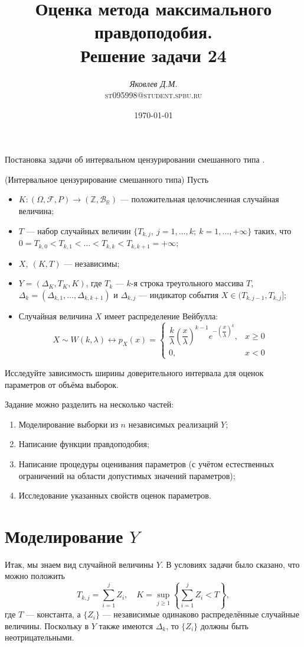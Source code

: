 \documentclass{article}
\title{Оценка метода максимального правдоподобия.\\
	Решение задачи 24}
\author{\emph{Яковлев Д.М.}\\\textsc{st095998@student.spbu.ru}}
\date{\today}
\DeclareMathOperator\R{\mathbb{R}}
\begin{document}
	\maketitle
	\nocite{RomGu}
	Постановка задачи об интервальном цензурировании смешанного типа \cite{ankorMLE}.
 
 	(Интервальное цензурирование смешанного типа) Пусть
 	\begin{itemize}
 		\item $K:(\Omega, \mathcal{F}, P)\rightarrow(\mathbb{Z}, \mathcal{B}_{\R})$ --- положительная целочисленная случайная величина;
 		\item $T$ --- набор случайных величин $\{T_{k,j},~j=1,\dots, k;~ k=1,\dots,+\infty\}$ таких, что $0=T_{k,0}<T_{k,1}<\dots<T_{k,k}<T_{k,k+1}=+\infty$;
 		\item $X,~(K,T)$ --- независимы;
 		\item $Y=(\Delta_K,T_K,K)$, где $T_k$ --- $k$-я строка треугольного массива $T$, $\Delta_k=(\Delta_{k,1},\dots,\Delta_{k, k+1})$ и $\Delta_{k,j}$ --- индикатор события $X\in(T_{k,j-1},T_{k, j}]$;
 		\item Случайная величина $X$ имеет распределение Вейбулла:
 		\begin{equation*}
 			X\sim W(k, \lambda) \leftrightarrow p_X(x)=\begin{cases}
 				\dfrac{k}{\lambda}\left(\dfrac{x}{\lambda}\right)^{k-1}e^{-\left(\dfrac{x}{\lambda}\right)^k},&x\geqslant0\\
 				0,&x<0
 			\end{cases}
 		\end{equation*}
 	\end{itemize}
 	
	Исследуйте зависимость ширины доверительного интервала для оценок параметров от объёма выборок.
	
	Задание можно разделить на несколько частей:
	\begin{enumerate}
		\item Моделирование выборки из $n$ независимых реализаций $Y$;
		\item Написание функции правдоподобия;
		\item Написание процедуры оценивания параметров (с учётом естественных ограничений на области допустимых значений параметров);
		\item Исследование указанных свойств оценок параметров.
	\end{enumerate}
	
	\section{Моделирование $Y$}
	Итак, мы знаем вид случайной величины $Y$. В условиях задачи было сказано, что можно положить
	\begin{equation*}
		T_{k,j}=\sum_{i=1}^jZ_i,\quad K=\sup_{j\geqslant1}\left\{\sum_{i=1}^jZ_i<T\right\},
	\end{equation*}
	где $T$ --- константа, а $\{Z_i\}$ --- независимые одинаково распределённые случайные величины. Поскольку в $Y$ также имеются $\Delta_k$, то $\{Z_i\}$ должны быть неотрицательными.
	
\end{document}
